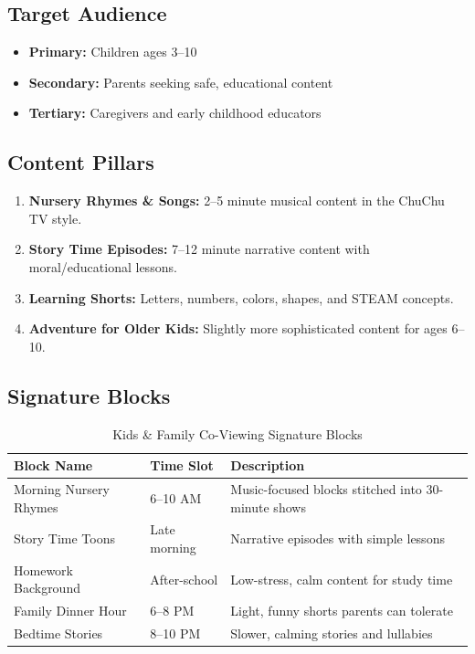 \documentclass[12pt,letterpaper,twoside]{report}
\begin{document}
\subsection{Target Audience}

\begin{itemize}[leftmargin=1.5cm]
    \item \textbf{Primary:} Children ages 3--10
    \item \textbf{Secondary:} Parents seeking safe, educational content
    \item \textbf{Tertiary:} Caregivers and early childhood educators
\end{itemize}

\subsection{Content Pillars}

\begin{enumerate}[leftmargin=2cm]
    \item \textbf{Nursery Rhymes \& Songs:} 2--5 minute musical content in the ChuChu TV style.
    \item \textbf{Story Time Episodes:} 7--12 minute narrative content with moral/educational lessons.
    \item \textbf{Learning Shorts:} Letters, numbers, colors, shapes, and STEAM concepts.
    \item \textbf{Adventure for Older Kids:} Slightly more sophisticated content for ages 6--10.
\end{enumerate}

\subsection{Signature Blocks}

\begin{table}[H]
\centering
\caption{Kids \& Family Co-Viewing Signature Blocks}
\label{tab:kids-blocks}
\begin{tabular}{@{}L{4cm}L{2.5cm}L{7cm}@{}}
\toprule
\textbf{Block Name} & \textbf{Time Slot} & \textbf{Description} \\
\midrule
Morning Nursery Rhymes & 6--10 AM & Music-focused blocks stitched into 30-minute shows \\
\addlinespace
Story Time Toons & Late morning & Narrative episodes with simple lessons \\
\addlinespace
Homework Background & After-school & Low-stress, calm content for study time \\
\addlinespace
Family Dinner Hour & 6--8 PM & Light, funny shorts parents can tolerate \\
\addlinespace
Bedtime Stories & 8--10 PM & Slower, calming stories and lullabies \\
\bottomrule
\end{tabular}
\end{table}
\end{document}
